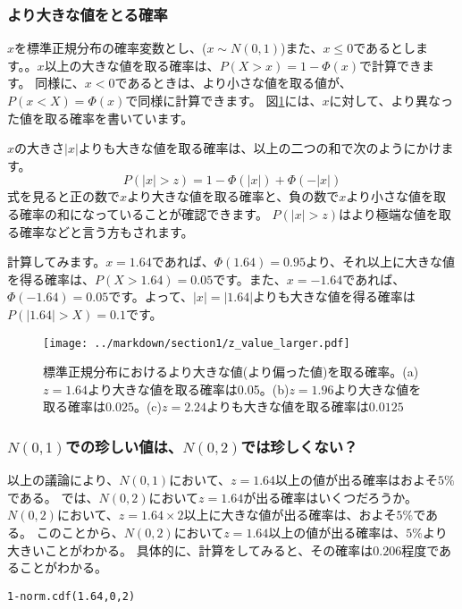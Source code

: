 \documentclass[a4paper,11pt,dvipdfmx]{jsarticle}
\begin{document}
\subsubsection{より大きな値をとる確率}
$x$を標準正規分布の確率変数とし、($x\sim N(0,1)$)また、$x\leq 0$であるとします。。$x$以上の大きな値を取る確率は、$P(X>x)=1-\varPhi(x)$で計算できます。
同様に、$x < 0$であるときは、より小さな値を取る値が、$P(x<X)=\varPhi(x)$で同様に計算できます。
図\ref{fig:z_value_larger}には、$x$に対して、より異なった値を取る確率を書いています。

$x$の大きさ$|x|$よりも大きな値を取る確率は、以上の二つの和で次のようにかけます。
\begin{equation}
    P(|x|>z) = 1-\varPhi(|x|)+\varPhi(-|x|)
\end{equation}
式を見ると正の数で$x$より大きな値を取る確率と、負の数で$x$より小さな値を取る確率の和になっていることが確認できます。
$P(|x|>z)$はより極端な値を取る確率などと言う方もされます。

計算してみます。$x=1.64$であれば、$\varPhi(1.64)=0.95$より、それ以上に大きな値を得る確率は、$P(X>1.64)=0.05$です。また、$x=-1.64$であれば、$\varPhi(-1.64)=0.05$です。よって、$|x|=|1.64|$よりも大きな値を得る確率は$P(|1.64|>X)=0.1$です。


\begin{figure}
    \begin{center}
        \texttt{[image: ../markdown/section1/z\_value\_larger.pdf]}
        \caption{標準正規分布におけるより大きな値(より偏った値)を取る確率。(a)$z=1.64$より大きな値を取る確率は0.05。(b)$z=1.96$より大きな値を取る確率は$0.025$。(c)$z=2.24$よりも大きな値を取る確率は$0.0125$}
        \label{fig:z_value_larger}
      \end{center}
    \end{figure}

\subsubsection{$N(0,1)$での珍しい値は、$N(0,2)$では珍しくない？}
以上の議論により、$N(0,1)$において、$z=1.64$以上の値が出る確率はおよそ$5\%$である。
では、$N(0,2)$において$z=1.64$が出る確率はいくつだろうか。
$N(0,2)$において、$z=1.64\times2$以上に大きな値が出る確率は、およそ$5\%$である。
このことから、$N(0,2)$において$z=1.64$以上の値が出る確率は、$5\%$より大きいことがわかる。
具体的に、計算をしてみると、その確率は$0.206$程度であることがわかる。
\begin{lstlisting}
1-norm.cdf(1.64,0,2)
\end{lstlisting}
\end{document}
